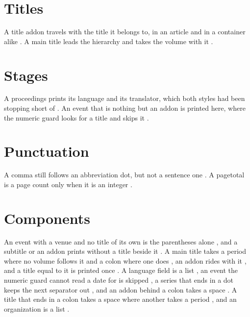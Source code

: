 \documentclass[acmsmall,nonacm,natbib=false]{acmart}
\begin{document}
\thispagestyle{empty}

\section*{Titles}
A title addon travels with the title it belongs to, in an article and in a container alike \cite{TiAddon,TiBook}.
A main title leads the hierarchy and takes the volume with it \cite{TiMain}.

\section*{Stages}
A proceedings prints its language and its translator, which both styles had been stopping short of \cite{PrLang}.
An event that is nothing but an addon is printed here, where the numeric guard looks for a title and skips it \cite{EvAddon}.

\section*{Punctuation}
A comma still follows an abbreviation dot, but not a sentence one \cite{PnOrg,PnSer}.
A pagetotal is a page count only when it is an integer \cite{Pg01,PgRng}.

\section*{Components}
An event with a venue and no title of its own is the parentheses alone \cite{EvVenue}, and a subtitle or an addon prints without a title beside it \cite{TiSubOnly,TiAddOnly}.
A main title takes a period where no volume follows it and a colon where one does \cite{MtPlain,MtVol}, an addon rides with it \cite{MtAddon}, and a title equal to it is printed once \cite{MtSame}.
A language field is a list \cite{LgThree}, an event the numeric guard cannot read a date for is skipped \cite{EvGuard}, a series that ends in a dot keeps the next separator out \cite{PnSerNum}, and an addon behind a colon takes a space \cite{AdColon}.
A title that ends in a colon takes a space where another takes a period \cite{KoTitle,KoSub,KoBook,KoMain}, and an organization is a list \cite{OrThree}.

\printbibliography
\end{document}
